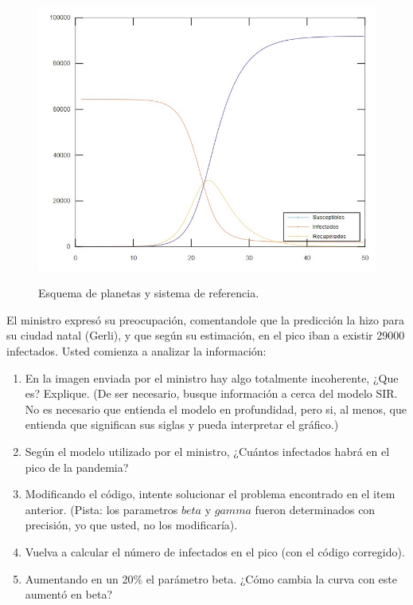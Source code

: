 \documentclass[a4paper,11pt]{article}
\theoremstyle{mytheor}
\begin{document}
\begin{figure}[h]
\centering
\includegraphics[width=.85\linewidth]{prediccion.jpeg}
\label{fig:f2}
\caption{Esquema de planetas y sistema de referencia.}

\end{figure}

El ministro expresó su preocupación, comentandole que la predicción la hizo para su ciudad natal (Gerli), y que según su estimación, en el pico iban a existir 29000 infectados. Usted comienza a analizar la información:


\begin{enumerate}
\item En la imagen enviada por el ministro hay algo totalmente incoherente, ¿Que es? Explique. (De ser necesario, busque información a cerca del modelo SIR. No es necesario que entienda el modelo en profundidad, pero si, al menos, que entienda que significan sus siglas y pueda interpretar el gráfico.)

\item Según el modelo utilizado por el ministro, ¿Cuántos infectados habrá en el pico de la pandemia?

\item Modificando el código, intente solucionar el problema encontrado en el item anterior. (Pista: los parametros $beta$ y $gamma$ fueron determinados con precisión, yo que usted, no los modificaría). 

\item Vuelva a calcular el número de infectados en el pico (con el código corregido).

\item Aumentando en un 20\% el parámetro beta. ¿Cómo cambia la curva con este aumentó en beta?

\end{enumerate}
\end{document}

